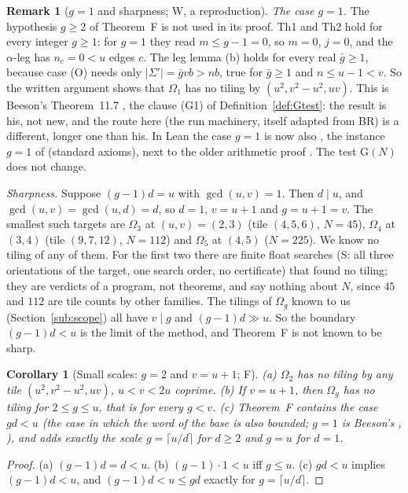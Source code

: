 \documentclass[11pt,reqno]{amsart}
\theoremstyle{plain}
\newtheorem{corollary}[theorem]{Corollary}
\theoremstyle{definition}
\newtheorem{remark}[theorem]{Remark}
\newcommand{\sF}{\textup{\textsf{F}}}
\newcommand{\sW}{\textup{\textsf{W}}}
\newcommand{\sS}{\textup{\textsf{S}}}
\begin{document}
\begin{remark}[$g=1$ and sharpness; \sW, a reproduction]\label{rem:gone}
\emph{The case $g=1$.} The hypothesis $g\ge2$ of Theorem~F is not used in its proof. Th1 and Th2 hold for every integer $g\ge1$: for $g=1$ they read $m\le g-1=0$, so $m=0$, $j=0$, and the $\alpha$-leg has $n_c=0<u$ edges $c$. The leg lemma (b) holds for every real $\bar g\ge1$, because case (O) needs only $|\Sigma'|=\bar gvb>nb$, true for $\bar g\ge1$ and $n\le u-1<v$. So the written argument shows that $\Omega_{1}$ has no tiling by $(u^2,v^2-u^2,uv)$. This is Beeson's Theorem~11.7 \cite{BeesonIso}, the clause (G1) of Definition~\ref{def:Gtest}: the result is his, not new, and the route here (the run machinery, itself adapted from BR) is a different, longer one than his. In Lean the case $g=1$ is now also , the instance $g=1$ of  (standard axioms), next to the older arithmetic proof . The test $\mathrm G(N)$ does not change.

\emph{Sharpness.} Suppose $(g-1)d=u$ with $\gcd(u,v)=1$. Then $d\mid u$, and $\gcd(u,v)=\gcd(u,d)=d$, so $d=1$, $v=u+1$ and $g=u+1=v$. The smallest such targets are $\Omega_{3}$ at $(u,v)=(2,3)$ (tile $(4,5,6)$, $N=45$), $\Omega_{4}$ at $(3,4)$ (tile $(9,7,12)$, $N=112$) and $\Omega_{5}$ at $(4,5)$ ($N=225$). We know no tiling of any of them. For the first two there are finite float searches (\sS: all three orientations of the target, one search order, no certificate) that found no tiling; they are verdicts of a program, not theorems, and say nothing about $N$, since $45$ and $112$ are tile counts by other families. The tilings of $\Omega_{g}$ known to us (Section~\ref{sub:scope}) all have $v\mid g$ and $(g-1)d\gg u$. So the boundary $(g-1)d<u$ is the limit of the method, and Theorem~F is not known to be sharp.
\end{remark}

\begin{corollary}[Small scales: $g=2$ and $v=u+1$; \sF]\label{cor:small}
\textup{(a)} $\Omega_{2}$ has no tiling by any tile $(u^2,v^2-u^2,uv)$, $u<v<2u$ coprime. \textup{(b)} If $v=u+1$, then $\Omega_{g}$ has no tiling for $2\le g\le u$, that is for every $g<v$.
\textup{(c)} Theorem~F contains the case $gd<u$ (the case in which the word of the base is also bounded; $g=1$ is Beeson's \cite[Thm.~11.7]{BeesonIso}, ), and adds exactly the scale $g=\lceil u/d\rceil$ for $d\ge2$ and $g=u$ for $d=1$.
\end{corollary}
\begin{proof}
(a) $(g-1)d=d<u$. (b) $(g-1)\cdot1<u$ iff $g\le u$. (c) $gd<u$ implies $(g-1)d<u$, and $(g-1)d<u\le gd$ exactly for $g=\lceil u/d\rceil$.
\end{proof}
\end{document}

